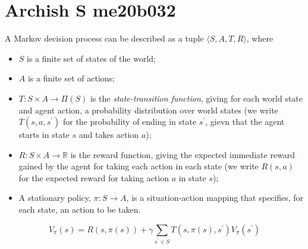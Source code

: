 \section{Archish S me20b032}
A Markov decision process can be described as a tuple $ \langle S, A, T, R \rangle $, where
\begin{itemize}
	\item $S$ is a finite set of states of the world;
	\item $A$ is a finite set of actions;
	\item $ T : S \times A \rightarrow \Pi(S)$ is the \textit{state-transition function}, giving for each world state and agent action, a probability distribution over world states (we write $T(s,a,s^\prime)$ for the probability of ending in state $s^\prime$, gievn that the agent starts in state $s$ and takes action $a$);
	\item $ R : S \times A \rightarrow \mathbb{R}$ is the reward function, giving the expected immediate reward gained by the agent for taking each action in each state (we write $R(s,a)$ for the expected reward for taking action $a$ in state $s$);
	\item A stationary policy, $ \pi : S \rightarrow A $, is a situation-action mapping that specifies, for each state, an action to be taken.
\end{itemize}

\begin{equation}
	V_{\pi}(s) = R(s,\pi(s)) + \gamma \sum_{s^\prime \in S} T(s, \pi(s), s^\prime) V_{\pi}(s^\prime)
\end{equation}
